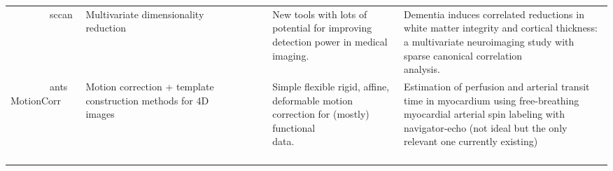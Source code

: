 \documentclass[18pt]{beamer}
\begin{document}
\begin{frame}
\begin{tiny}
{\begin{table}
\begin{tabular}{|p{2.1cm}|p{2.4cm}|p{3cm}|p{3cm}|}
        sccan                                         & Multivariate dimensionality reduction                                                                                                                          & New tools with lots of potential for improving detection power in medical imaging.                                 & Dementia induces correlated reductions in white matter integrity and cortical thickness: a multivariate neuroimaging study with sparse canonical correlation analysis.                              \\ 
        antsMotionCorr                                & Motion correction + template construction methods for 4D images                                                                                                & Simple flexible rigid, affine, deformable motion correction for (mostly) functional data.                          & Estimation of perfusion and arterial transit time in myocardium using free-breathing myocardial arterial spin labeling with navigator-echo (not ideal but the only relevant one currently existing) \\
\hline
\end{tabular}
\end{table}
}
\end{tiny}
\end{frame}
\end{document}
